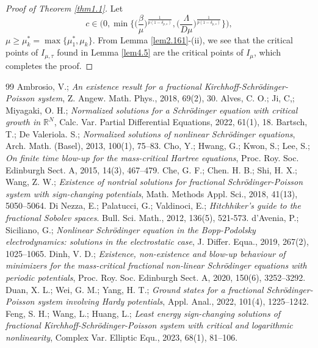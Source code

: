 \documentclass[10pt,a4paper]{amsart}
\numberwithin{equation}{section}
\begin{document}
\begin{proof}[Proof of Theorem \ref{thm1.1}]
 Let 
\[
c\in\Big(0, \min\Big\{\big(\frac{\beta}{\mu}\big)^{\frac{1}{p(1-\delta_{p,s})}}, 
\big(\frac{\Lambda}{D\mu}\big)^{\frac{1}{p(1-\delta_{p,s})}}\Big\}\Big),
\]
 $\mu\geq \mu^*_k=\max\{\mu^*_1, \mu_k\}$. From Lemma \ref{lem2.161}-(ii), 
 we see that the critical points of $I_{\mu, \tau}$ found in Lemma \ref{lem4.5} 
are the critical points of $I_\mu$, which completes the proof.
\end{proof}

\begin{thebibliography}{99}
 Ambrosio,  V.; \emph{An existence result for a fractional Kirchhoff-Schr\"odinger-Poisson system}, Z. Angew. Math. Phys., 2018, 69(2),  30.
 Alves, C. O.; Ji, C,; Miyagaki, O. H.; \emph{Normalized solutions for a Schr\"odinger  equation with critical growth in $\mathbb{R}^N$}, Calc. Var. Partial Differential Equations, 2022,   61(1), 18.
 Bartsch, T.; De Valeriola. S.; \emph{Normalized solutions of nonlinear Schr\"odinger equations}, Arch. Math. (Basel), 2013,  100(1), 75--83.
 Cho, Y.;  Hwang,  G.;  Kwon, S.;  Lee, S.; \emph{On finite time blow-up for the mass-critical Hartree equations}, Proc. Roy. Soc. Edinburgh Sect. A,  2015,  14(3), 467--479.
 Che, G. F.; Chen. H. B.; Shi, H. X.; Wang, Z. W.; \emph{Existence of nontrial solutions for fractional Schr\"odinger-Poisson system with sign-changing  potentials}, Math. Methods Appl. Sci., 2018, 41(13), 5050--5064.
 Di Nezza, E.; Palatucci, G.; Valdinoci, E.; \emph{Hitchhiker's guide to the fractional Sobolev spaces}. Bull. Sci. Math., 2012, 136(5), 521-573.
 d'Avenia, P.;  Siciliano, G.; \emph{Nonlinear Schr\"odinger equation in the Bopp-Podolsky electrodynamics: solutions in the electrostatic case}, J. Differ. Equa.,  2019,  267(2), 1025--1065.
 Dinh, V. D.; \emph{Existence, non-existence and blow-up behaviour of minimizers for the mass-critical fractional non-linear Schr\"odinger equations with periodic potentials}, Proc. Roy. Soc. Edinburgh Sect. A,  2020,  150(6), 3252--3292.
 Duan, X. L.; Wei, G. M.; Yang, H. T.; \emph{Ground states for a fractional Schr\"odinger-Poisson system involving Hardy potentials}, Appl. Anal., 2022, 101(4), 1225--1242.
 Feng, S. H.; Wang, L.; Huang, L.; \emph{Least energy sign-changing solutions of fractional Kirchhoff-Schr\"odinger-Poisson system with critical and logarithmic nonlinearity}, Complex Var. Elliptic Equ., 2023,  68(1), 81--106.

\end{thebibliography}
\end{document}
